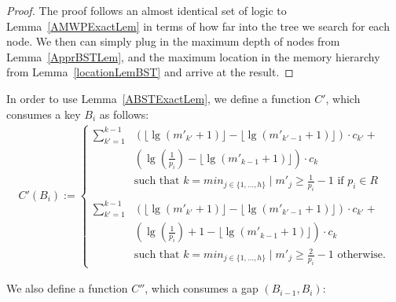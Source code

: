 \documentclass[letterpaper,12pt,titlepage,oneside,final]{book}
\theoremstyle{plain}
\begin{document}
\begin{proof}
The proof follows an almost identical set of logic to Lemma~\ref{AMWPExactLem} in terms of how far into the tree we search for each node. We then can simply plug in the maximum depth of nodes from Lemma~\ref{ApprBSTLem}, and the maximum location in the memory hierarchy from Lemma~\ref{locationLemBST} and arrive at the result.
\end{proof}


In order to use Lemma~\ref{ABSTExactLem}, we define a function $C'$, which consumes a key $B_i$ as follows:
\begin{align*} 
C'(B_i) := 
\begin{cases}
 \sum_{k'=1}^{k-1} &\left(\lfloor \lg(m'_{k'}+1) \rfloor - \lfloor \lg(m'_{k'-1}+1) \rfloor \right)\cdot c_{k'}+ \\
 &\left(\lg(\frac{1}{p_i}) - \lfloor \lg(m'_{k-1}+1) \rfloor \right)\cdot c_k\\
&\text{such that } k=min_{j \in \{1, ..., h\}} \mid m'_j \geq \frac{1}{p_i}-1 \text{ if } p_i \in R \\\\
 \sum_{k'=1}^{k-1} &\left(\lfloor \lg(m'_{k'}+1) \rfloor - \lfloor \lg(m'_{k'-1}+1) \rfloor \right)\cdot c_{k'}+ \\
 &\left(\lg(\frac{1}{p_i}) + 1 - \lfloor \lg(m'_{k-1}+1) \rfloor \right)\cdot c_k\\
&\text{such that } k=min_{j \in \{1, ..., h\}} \mid m'_j \geq \frac{2}{p_i}-1 \text{ otherwise.}  
\end{cases}
\end{align*}

We also define a function $C''$, which consumes a gap $(B_{i-1},B_i)$:
\end{document}
